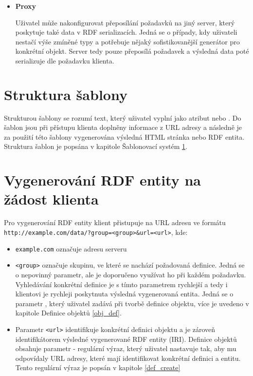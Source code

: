 \documentclass[thesis=B,czech]{FITthesis}[2012/06/26]
\begin{document}
\begin{itemize}
      
    \item \textbf{Proxy}
    
      Uživatel může nakonfigurovat přeposílání požadavků na jiný server, který poskytuje také data v RDF serializacích. Jedná se o případy, kdy uživateli
      nestačí výše zmíněné typy a potřebuje nějaký sofistikovanější generátor pro konkrétní objekt. Server tedy pouze přeposílá požadavek a výsledná
      data poté serializuje dle požadavku klienta.
    
    \end{itemize}
    
    \section{Struktura šablony}\label{template_system}
    Strukturou šablony se rozumí text, který uživatel vyplní jako atribut  nebo . Do šablon jsou při přístupu klienta 
    doplněny informace z URL adresy a následně je za použití této šablony vygenerována výsledná HTML stránka nebo RDF entita.
    Struktura šablon je popsána v kapitole Šablonovací systém \ref{template_system}.
    
    
    \section{Vygenerování RDF entity na žádost klienta}\label{obj_access}
    Pro vygenerování RDF entity klient přistupuje na URL adresu ve formátu \texttt{http://example.com/data/?group=<group>\&url=<url>}, kde:
    \begin{itemize}
     \item \texttt{example.com} označuje adresu serveru
     \item \texttt{<group>} označuje skupinu, ve které se nachází požadovaná definice. Jedná se o nepovinný parametr, ale je doporučeno využívat ho při 
     každém požadavku. Vyhledávání konkrétní definice je s tímto parametrem rychlejší a tedy i klientovi je rychleji poskytnuta výsledná vygenerovaná entita.
     Jedná se o parametr , který uživatel zadává při tvorbě definice objektu, více je uvedeno v kapitole Definice objektů \ref{obj_def}.
     \item Parametr \texttt{<url>} identifikuje konkrétní definici objektu a je zároveň identifikátorem výsledné vygenerované RDF entity (IRI).
     Definice objektů obsahuje parametr  - regulární výraz, který uživatel nastavuje tak, aby mu odpovídaly URL adresy, které mají identifikovat
     konkrétní definici a entitu. Tento regulární výraz je popsán v kapitole \ref{def_create}
    \end{itemize}
    
\end{document}
